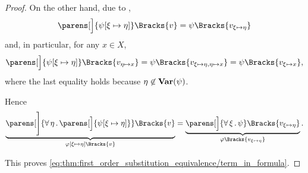 \begin{proof}
  On the other hand, due to ,
  \begin{equation*}
    \parens[\Big]{ \psi[\xi \mapsto \eta] }\Bracks{v} = \psi\Bracks{v_{\xi \mapsto \eta}}
  \end{equation*}
  and, in particular, for any \( x \in X \),
  \begin{equation*}
    \parens[\Big]{ \psi[\xi \mapsto \eta] }\Bracks{v_{\eta \mapsto x}}
    =
    \psi\Bracks{v_{\xi \mapsto \eta,\eta \mapsto x}}
    =
    \psi\Bracks{v_{\xi \mapsto x}},
  \end{equation*}
  where the last equality holds because \( \eta \not\in \operatorname{\mathbf{Var}}(\psi) \).

  Hence
  \begin{equation*}
    \underbrace{ \parens[\Bigg]{\qforall \eta \parens[\Big]{ \psi[\xi \mapsto \eta] } }\Bracks{v} }_{\varphi[\xi \mapsto \eta]\Bracks{v}}
    =
    \underbrace{ \parens[\Big]{\qforall \xi \psi }\Bracks{v_{\xi \mapsto \eta}} }_{\varphi\Bracks{v_{\xi \mapsto \eta}}}.
  \end{equation*}

  This proves \eqref{eq:thm:first_order_substitution_equivalence/term_in_formula}.
\end{proof}

